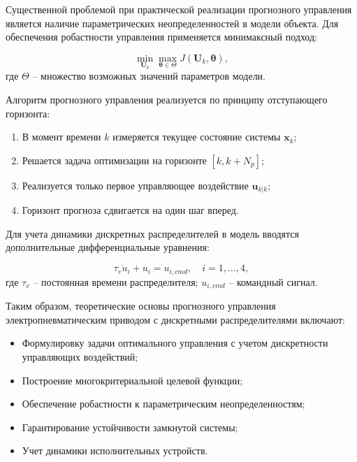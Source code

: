 Существенной проблемой при практической реализации прогнозного управления является наличие параметрических неопределенностей
в модели объекта. Для обеспечения робастности управления применяется минимаксный подход:

\begin{equation}
\min_{\mathbf{U}_k} \max_{\boldsymbol{\theta} \in \Theta} J(\mathbf{U}_k, \boldsymbol{\theta}),
\end{equation}
где $\Theta$ -- множество возможных значений параметров модели.

Алгоритм прогнозного управления реализуется по принципу отступающего горизонта:

\begin{enumerate}
\item  В момент времени $k$ измеряется текущее состояние системы $\mathbf{x}_k$;
\item  Решается задача оптимизации на горизонте $[k, k+N_p]$;
\item  Реализуется только первое управляющее воздействие $\mathbf{u}_{k|k}$;
\item  Горизонт прогноза сдвигается на один шаг вперед.
	
\end{enumerate}

Для учета динамики дискретных распределителей в модель вводятся дополнительные дифференциальные уравнения:

\begin{equation}
\tau_v\dot{u}_i + u_i = u_{i,cmd}, \quad i = 1,\ldots,4,
\end{equation}
где $\tau_v$ -- постоянная времени распределителя;
$u_{i,cmd}$ -- командный сигнал.

Таким образом, теоретические основы прогнозного управления электропневматическим приводом с дискретными распределителями включают:

\begin{itemize}
\item Формулировку задачи оптимального управления с учетом дискретности управляющих воздействий;
\item Построение многокритериальной целевой функции;
\item Обеспечение робастности к параметрическим неопределенностям;
\item Гарантирование устойчивости замкнутой системы;
\item Учет динамики исполнительных устройств.
	
\end{itemize}
